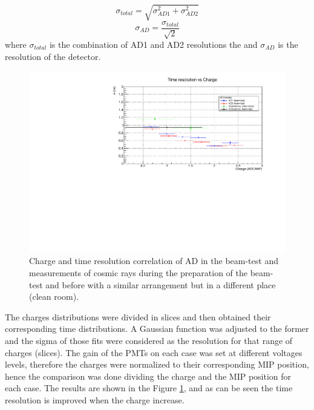 	\begin{equation}
	\sigma_{total}=\sqrt{\sigma^2_{AD1}+\sigma^2_{AD2}}
	\end{equation}
	\begin{equation}
	\sigma_{AD}=\frac{\sigma_{total}}{\sqrt{2}}
	\end{equation}
	where $\sigma_{total}$ is the combination of AD1 and AD2 resolutions the and $\sigma_{AD}$  is the resolution 
	of the detector.
	
	\begin{figure}[h!]
		\begin{center}
	\includegraphics[scale=0.70]{images/time/RestVsCharge-Note_ext.pdf}%
			\caption{Charge and time resolution correlation of AD in the beam-test and 
				measurements of cosmic rays during the preparation of the beam-test and before with a similar arrangement but in a different place (clean room).}
			\label{figure:ResCompareExt}
		\end{center}
	\end{figure}
	
	The charges distributions were divided in slices and then obtained their corresponding time distributions. A Gaussian function was adjusted to the former and the sigma of those fits were considered as the resolution for that range of charges (slices). The gain of the PMTs on each case was set at different voltages levels, therefore the charges were normalized to their corresponding MIP position, hence the comparison was done dividing the charge and the MIP position for each case. The results are shown in the Figure \ref{figure:ResCompareExt}, and as can be seen the time resolution is improved when the charge increase.
	
